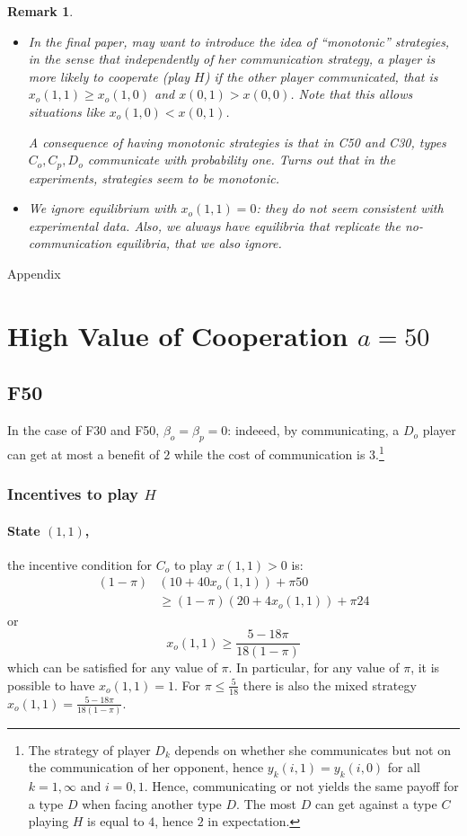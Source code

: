 \documentclass[12pt]{article}
\newtheorem{remark}{Remark}
\begin{document}
\begin{remark}
	\begin{itemize}
		\item In the final paper, may want to introduce the idea of ``monotonic'' strategies, in the sense that independently of her communication strategy, a player is more likely to cooperate (play $H$) if the other player communicated, that is $x_o(1,1)\geq x_o(1,0)$ and $x(0,1)>x(0,0)$. Note that this allows situations like $x_o(1,0)<x(0,1)$.

		A consequence of having monotonic strategies is that in C50 and C30, types $C_o,C_p,D_o$ communicate with probability one. Turns out that in the experiments, strategies seem to be monotonic.
		\item We ignore equilibrium with $x_o(1,1)=0$: they do not seem consistent with experimental data. Also, we always have equilibria that replicate the no-communication equilibria, that we also ignore.
	\end{itemize}
\end{remark}

\pagebreak

\appendix
\begin{center}
	\Huge{Appendix}
\end{center} 

\section{High Value of Cooperation $a=50$}
\subsection{F50}
In the case of F30 and F50, $\beta_o=\beta_p=0$: indeeed, by communicating, a $D_o$ player can get at most a benefit of $2$ while the cost of communication is $3$.\footnote{%
The strategy of player $D_k$ depends on whether she communicates but not on the communication of her opponent, hence $y_k(i,1)=y_k(i,0)$ for all $k=1,\infty$ and $i=0,1$. Hence, communicating or not yields the same payoff for a type $D$ when facing another type $D$. The most $D$ can get against a type $C$ playing $H$ is equal to $4$, hence $2$ in expectation.
}
%
\subsubsection*{Incentives to play $H$}
\paragraph{State $(1,1)$,} the incentive condition for $C_o$ to play $x(1,1)>0$ is:
\begin{align*}
	(1-\pi) &(10+40x_o(1,1))+\pi 50\\
		&\geq (1-\pi) (20+4x_o(1,1))+\pi 24
\end{align*}
or
\[
x_o(1,1)\geq \frac{5-18\pi}{18(1-\pi)}
\]
which can  be satisfied for any value of $\pi$. In particular, for any value of $\pi$, it is possible to have $x_o(1,1)=1$. For $\pi\leq \frac{5}{18}$ there is also the mixed strategy $x_o(1,1)=\frac{5-18\pi}{18(1-\pi)}$.
\end{document}
